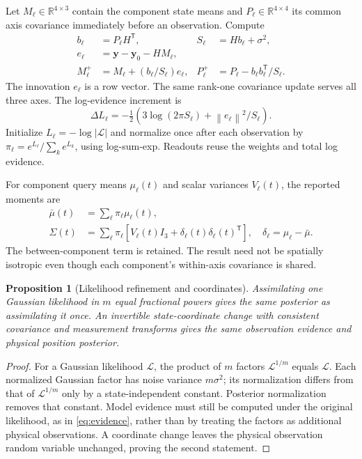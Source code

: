 \documentclass[journal]{IEEEtran}
\newtheorem{proposition}{Proposition}
\newcommand{\R}{\mathbb{R}}
\newcommand{\norm}[1]{\left\lVert#1\right\rVert}
\newcommand{\trans}{\mathsf{T}}
\begin{document}
Let $M_\ell\in\R^{4\times3}$ contain the component state means and
$P_\ell\in\R^{4\times4}$ its common axis covariance immediately before
an observation. Compute
\begin{align}
 b_\ell&=P_\ell H^\trans,&S_\ell&=Hb_\ell+\sigma^2,\nonumber\\
 e_\ell&=\bm y-\bm y_0-HM_\ell,\label{eq:innovation}\\
 M_\ell^+&=M_\ell+(b_\ell/S_\ell)e_\ell,&
 P_\ell^+&=P_\ell-b_\ell b_\ell^\trans/S_\ell.
 \label{eq:update}
\end{align}
The innovation $e_\ell$ is a row vector. The same rank-one covariance
update serves all three axes. The log-evidence increment is
\begin{equation}
 \Delta L_\ell=-\tfrac12
 \left(3\log(2\pi S_\ell)+\norm{e_\ell}^2/S_\ell\right).
 \label{eq:evidence}
\end{equation}
Initialize $L_\ell=-\log|\mathcal L|$ and normalize once after each
observation by $\pi_\ell=e^{L_\ell}/\sum_k e^{L_k}$, using log-sum-exp.
Readouts reuse the weights and total log evidence.

For component query means $\mu_\ell(t)$ and scalar variances $V_\ell(t)$,
the reported moments are
\begin{align}
 \bar\mu(t)&=\sum_\ell\pi_\ell\mu_\ell(t),\label{eq:mixmean}\\
 \Sigma(t)&=\sum_\ell\pi_\ell
 \left[V_\ell(t)I_3+\delta_\ell(t)\delta_\ell(t)^\trans\right],
 \quad \delta_\ell=\mu_\ell-\bar\mu.
 \label{eq:mixcov}
\end{align}
The between-component term is retained. The result need not be spatially
isotropic even though each component's within-axis covariance is shared.

\begin{proposition}[Likelihood refinement and coordinates]
Assimilating one Gaussian likelihood in $m$ equal fractional powers gives
the same posterior as assimilating it once. An invertible state-coordinate
change with consistent covariance and measurement transforms gives the
same observation evidence and physical position posterior.
\end{proposition}
\begin{proof}
For a Gaussian likelihood $\mathcal{L}$, the product of $m$ factors
$\mathcal{L}^{1/m}$ equals $\mathcal{L}$. Each normalized Gaussian factor
has noise variance $m\sigma^2$; its normalization differs from that of
$\mathcal{L}^{1/m}$ only by a state-independent constant. Posterior
normalization removes that constant. Model evidence must still be
computed under the original likelihood, as in \eqref{eq:evidence},
rather than by treating the factors as additional physical observations.
A coordinate change leaves the physical observation random variable
unchanged, proving the second statement.
\end{proof}
\end{document}
